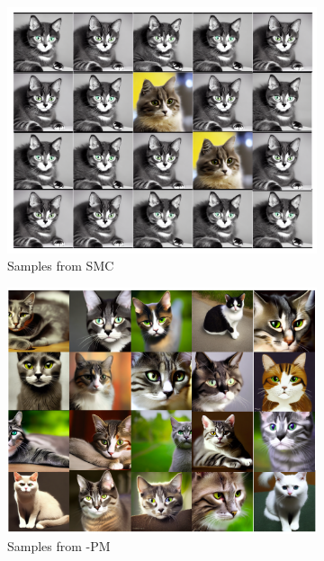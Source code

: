 {\begin{figure}[!t]
    \centering
       \begin{subfigure}[b]{0.48\textwidth}
    \includegraphics[width=1.0\linewidth]{images/SMC_result.png}
          \caption{Samples from SMC}
       \end{subfigure}%
        \begin{subfigure}[b]{0.48\textwidth} 
    \includegraphics[width=1.0 \linewidth]{images/PM_result.png}
          \caption{Samples from \alg-PM}
       \end{subfigure}
        \begin{subfigure}[b]{0.48\textwidth} 

\end{subfigure}
\end{figure}}
